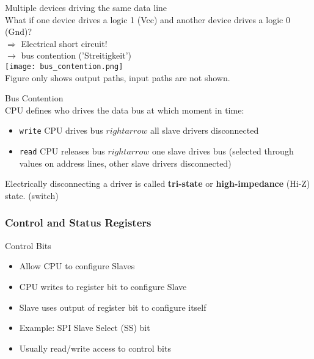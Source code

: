 \begin{corollary}{Multiple devices driving the same data line}\\
    What if one device drives a logic 1 (Vcc) and another device drives a logic 0 (Gnd)?\\
    $\Rightarrow$ Electrical short circuit!
    \\ $\rightarrow$ bus contention ('Streitigkeit')\\
    \texttt{[image: bus\_contention.png]}\\
    \small{Figure only shows output paths, input paths are not shown.}

\end{corollary}

\begin{concept}{Bus Contention} \\
    CPU defines who drives the data bus at which moment in time:
    \begin{itemize}
        \item \texttt{write} CPU drives bus $rightarrow$ all slave drivers disconnected
        \item \texttt{read} CPU releases bus $rightarrow$ one slave drives bus (selected through values on address lines, other slave drivers disconnected)
    \end{itemize}
    
    Electrically disconnecting a driver is called \textbf{tri-state} or \textbf{high-impedance} (Hi-Z) state. (switch)
    
\end{concept}

\multend

\subsubsection{Control and Status Registers}

\begin{concept}{Control Bits}
    \begin{itemize}
        \item Allow CPU to configure Slaves
        \item CPU writes to register bit to configure Slave
        \item Slave uses output of register bit to configure itself
        \item Example: SPI Slave Select (SS) bit
        \item Usually read/write access to control bits
    \end{itemize}
\end{concept}

